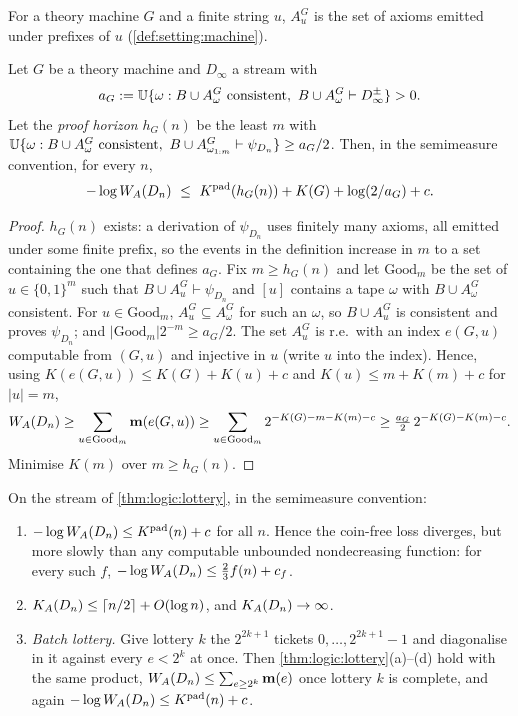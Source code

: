 For a theory machine $G$ and a finite string $u$, $A^G_u$ is the set of axioms emitted under prefixes of $u$ (\cref{def:setting:machine}).

\begin{proposition}\label{prop:logic:horizon}
Let $G$ be a theory machine and $D_\infty$ a stream with
\[
a_G:=\mathbb{U}\{\omega:B\cup A^G_\omega\text{ consistent},\ B\cup A^G_\omega\vdash D_\infty^\pm\}>0 .
\]
Let the \emph{proof horizon} $h_G(n)$ be the least $m$ with $\mathbb{U}\{\omega:B\cup A^G_\omega\text{ consistent},\ B\cup A^G_{\omega_{1:m}}\vdash\psi_{D_n}\}\ge a_G/2$. Then, in the semimeasure convention, for every $n$,
\[
-\log\WA(D_n)\ \le\ \Kpad(h_G(n))+K(G)+\log(2/a_G)+c .
\]
\end{proposition}

\begin{proof}
$h_G(n)$ exists: a derivation of $\psi_{D_n}$ uses finitely many axioms, all emitted under some finite prefix, so the events in the definition increase in $m$ to a set containing the one that defines $a_G$. Fix $m\ge h_G(n)$ and let $\mathrm{Good}_m$ be the set of $u\in\{0,1\}^m$ such that $B\cup A^G_u\vdash\psi_{D_n}$ and $[u]$ contains a tape $\omega$ with $B\cup A^G_\omega$ consistent. For $u\in\mathrm{Good}_m$, $A^G_u\subseteq A^G_\omega$ for such an $\omega$, so $B\cup A^G_u$ is consistent and proves $\psi_{D_n}$; and $\lvert\mathrm{Good}_m\rvert2^{-m}\ge a_G/2$. The set $A^G_u$ is r.e.\ with an index $e(G,u)$ computable from $(G,u)$ and injective in $u$ (write $u$ into the index). Hence, using $K(e(G,u))\le K(G)+K(u)+c$ and $K(u)\le m+K(m)+c$ for $\lvert u\rvert=m$,
\[
W_{A}(D_n)\ge\sum_{u\in\mathrm{Good}_m}\mathbf{m}(e(G,u))\ge\sum_{u\in\mathrm{Good}_m}2^{-K(G)-m-K(m)-c}\ge\tfrac{a_G}{2}\,2^{-K(G)-K(m)-c}.
\]
Minimise $K(m)$ over $m\ge h_G(n)$.
\end{proof}

\begin{corollary}\label{cor:logic:rate}
On the stream of \cref{thm:logic:lottery}, in the semimeasure convention:
\begin{enumerate}[label=(\alph*),leftmargin=*]
\item $-\log W_{A}(D_n)\le K^{\mathrm{pad}}(n)+c$ for all $n$. Hence the coin-free loss diverges, but more slowly than any computable unbounded nondecreasing function: for every such $f$, $-\log W_{A}(D_n)\le\frac23f(n)+c_f$.
\item $K_{A}(D_n)\le\lceil n/2\rceil+O(\log n)$, and $K_{A}(D_n)\to\infty$.
\item \emph{Batch lottery.} Give lottery $k$ the $2^{2k+1}$ tickets $0,\dots,2^{2k+1}-1$ and diagonalise in it against every $e<2^k$ at once. Then \cref{thm:logic:lottery}(a)--(d) hold with the same product, $W_{A}(D_n)\le\sum_{e\ge2^k}\mathbf{m}(e)$ once lottery $k$ is complete, and again $-\log W_{A}(D_n)\le K^{\mathrm{pad}}(n)+c$.
\end{enumerate}
\end{corollary}

